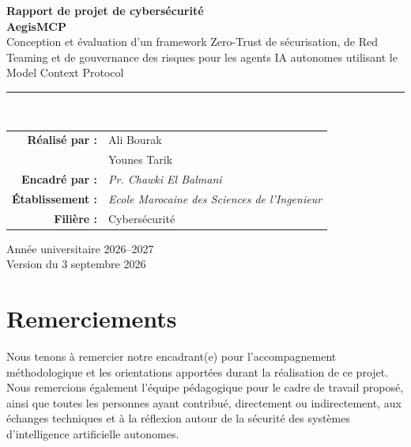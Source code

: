 \documentclass[12pt,a4paper,oneside]{report}
\begin{document}
\begin{titlepage}
    \centering
    \vspace*{0.8cm}

    {\Large \textbf{Rapport de projet de cybersécurité}}\\[1.4cm]

    {\Huge \textbf{AegisMCP}}\\[0.6cm]

    {\Large
    Conception et évaluation d'un framework Zero-Trust de sécurisation,
    de Red Teaming et de gouvernance des risques pour les agents IA
    autonomes utilisant le Model Context Protocol
    }\\[1.8cm]

    \rule{0.75\textwidth}{0.6pt}\\[1.4cm]

    \begin{tabular}{rl}
        \textbf{Réalisé par :} & Ali Bourak \\
                               & Younes Tarik \\[0.6cm]
        \textbf{Encadré par :} & \textit{Pr. Chawki El Balmani} \\[0.6cm]
        \textbf{Établissement :} & \textit{Ecole Marocaine des Sciences de l'Ingenieur} \\
        \textbf{Filière :} & Cybersécurité \\
    \end{tabular}

    \vfill

    {\large Année universitaire 2026--2027}\\[0.3cm]
    {\small Version du 3 septembre 2026}
\end{titlepage}


\chapter*{Remerciements}
Nous tenons à remercier notre encadrant(e) pour l'accompagnement méthodologique et les orientations apportées durant la réalisation de ce projet. Nous remercions également l'équipe pédagogique pour le cadre de travail proposé, ainsi que toutes les personnes ayant contribué, directement ou indirectement, aux échanges techniques et à la réflexion autour de la sécurité des systèmes d'intelligence artificielle autonomes.
\end{document}
